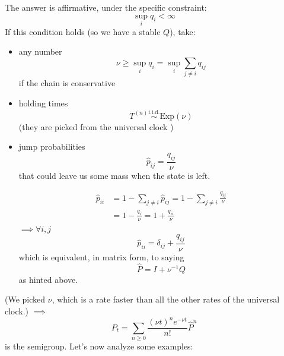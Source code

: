 \documentclass{article}
\begin{document}
The answer is affirmative, under the specific constraint:
\begin{equation*}
	\sup_i q_i < \infty
\end{equation*}
If this condition holds (so we have a stable $Q$), take:
\begin{itemize}
	\item any number 
	\begin{equation*}
		\nu \geq \sup_i q_i = \sup_i \sum_{j \neq i} q_{ij}
	\end{equation*}
	if the chain is conservative
	\item holding times 
	\begin{equation*}
		T^{(n)} \stackrel{\text{i.i.d.}}\sim \text{Exp}(\nu)
	\end{equation*}
	(they are picked from the universal clock )
	\item jump probabilities 
	\begin{equation*}
		\hat{p}_{ij} = \frac{q_{ij}}{\nu}
	\end{equation*}
	that could leave us some mass when the state is left.

	\begin{align*}
	\hat{p}_{ii} &= 1- \sum_{j \neq i} \hat{p}_{ij} = 1-\sum_{j \neq i} \frac{q_{ij}}{\nu} \\
	&= 1-\frac{q_i}{\nu} = 1 + \frac{q_{ii}}{\nu} 
\end{align*}
$\implies \forall i,j$
\begin{equation*}
	\hat{p}_{ii}  = \delta_{ij} +  \frac{q_{ij}}{\nu}
\end{equation*}
which is equivalent, in matrix form, to saying
\begin{equation*}
	\hat{P}= I + \nu^{-1} Q
\end{equation*}
as hinted above.
\end{itemize}
(We picked $\nu$, which is a rate faster than all the other rates of the universal clock.)
$\implies$
\begin{equation*}
	P_t = \sum_{n \geq 0} \frac{(\nu t)^n e^{-\nu t}}{n!} \hat{P}^n
\end{equation*}
is the semigroup. Let's now analyze some examples:
\end{document}
